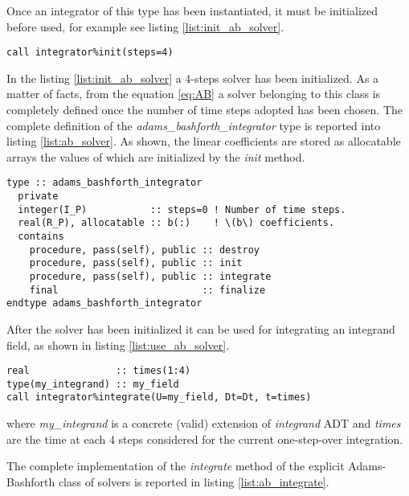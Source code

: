 \documentclass[pdftex,preprint,3p,times,numbers]{elsarticle}
\begin{document}
Once an integrator of this type has been instantiated, it must be initialized before used, for example see listing \ref{list:init_ab_solver}.

\begin{lstlisting}[firstnumber=1,style=code,caption={example of initialization of an explicit Adams-Bashforth integrator},label={list:init_ab_solver}]
call integrator%init(steps=4)
\end{lstlisting}

In the listing \ref{list:init_ab_solver} a 4-steps solver has been initialized. As a matter of facts, from the equation \ref{eq:AB} a solver belonging to this class is completely defined once the number of time steps adopted has been chosen. The complete definition of the \emph{adams\_bashforth\_integrator} type is reported into listing \ref{list:ab_solver}. As shown, the linear coefficients are stored as allocatable arrays the values of which are initialized by the \emph{init} method.

\begin{lstlisting}[firstnumber=1,style=code,caption={definition of \emph{adams\_bashforth\_integrator} type},label={list:ab_solver}]
type :: adams_bashforth_integrator
  private
  integer(I_P)           :: steps=0 ! Number of time steps.
  real(R_P), allocatable :: b(:)    ! \(b\) coefficients.
  contains
    procedure, pass(self), public :: destroy
    procedure, pass(self), public :: init
    procedure, pass(self), public :: integrate
    final                         :: finalize
endtype adams_bashforth_integrator
\end{lstlisting}

After the solver has been initialized it can be used for integrating an integrand field, as shown in listing \ref{list:use_ab_solver}.

\begin{lstlisting}[firstnumber=1,style=code,caption={example of usage of an Adams-Bashforth integrator},label={list:use_ab_solver}]
real               :: times(1:4)
type(my_integrand) :: my_field
call integrator%integrate(U=my_field, Dt=Dt, t=times)
\end{lstlisting}
where \emph{my\_integrand} is a concrete (valid) extension of \emph{integrand} ADT and \emph{times} are the time at each 4 steps considered for the current one-step-over integration.

The complete implementation of the \emph{integrate} method of the explicit Adams-Bashforth class of solvers is reported in listing \ref{list:ab_integrate}.
\end{document}

